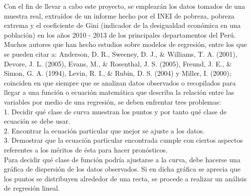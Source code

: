 \documentclass[twocolumn,twoside]{article}
\begin{document}
Con el fin de llevar a cabo este proyecto, se emplearán los datos tomados de una muestra real, 
extra\'idos de un informe hecho por el INEI de pobreza, pobreza extrema y el coeficiente de
Gini (indicador de la desigualdad econ\'omica en una poblaci\'on) en los años 2010 - 2013 de los
principales departamentos del Per\'u.\\

Muchos autores que han hecho estudios sobre
modelos de regresi\'on, entre los que se pueden
citar a: Anderson, D. R., Sweeney, D. J., \& Williams,
T. A. (2001), Devore, J. L. (2005), Evans, M., \&
Rosenthal, J. S. (2005), Freund, J. E., \& Simon,
G. A. (1994), Levin, R. I., \& Rubin, D. S. (2004)
y Miller, I. (2000); coinciden en que siempre que
se analizan datos observados o recopilados para 
llegar a una funci\'on o ecuaci\'on matem\'atica que
describa la relaci\'on entre las variables por medio de
una regresi\'on, se deben enfrentar tres problemas:\\
1. Decidir qu\'e clase de curva muestran los puntos
y por tanto qu\'e clase de ecuaci\'on se debe usar.\\
2. Encontrar la ecuaci\'on particular que mejor se
ajuste a los datos.\\
3. Demostrar que la ecuaci\'on particular encontrada
cumple con ciertos aspectos referentes a los méritos 
de \'esta para hacer pron\'osticos.\\

Para decidir qu\'e clase de funci\'on podr\'ia ajustarse
a la curva, debe hacerse una gr\'afica de dispersi\'on
de los datos observados. Si en dicha gr\'afica se aprecia 
que los puntos se distribuyen alrededor de una recta, se 
procede a realizar un an\'alisis de regresi\'on lineal.
\end{document}
